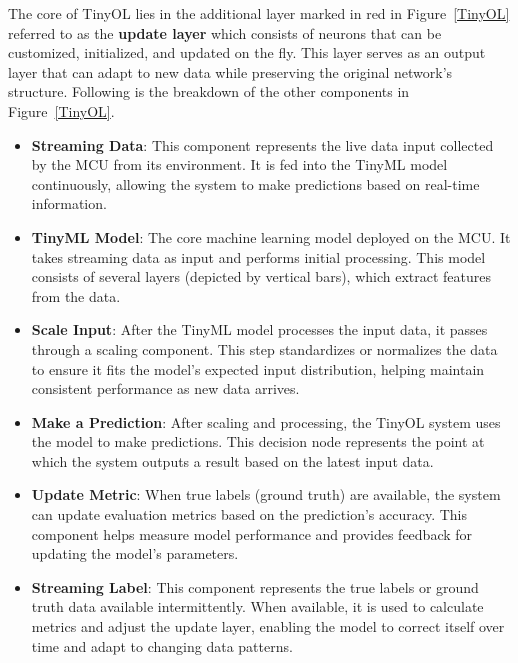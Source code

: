 \documentclass[twocolumn]{article}
\begin{document}
The core of TinyOL lies in the additional layer marked in red in Figure~\ref{TinyOL} referred to as the \textbf{update layer} which consists of neurons that can be customized, initialized, and updated on the fly. This layer serves as an output layer that can adapt to new data while preserving the original network's structure. Following is the breakdown of the other components in Figure~\ref{TinyOL}.

\begin{itemize}
    \item \textbf{Streaming Data}:
    This component represents the live data input collected by the MCU from its environment. It is fed into the TinyML model continuously, allowing the system to make predictions based on real-time information.

    \item \textbf{TinyML Model}:
    The core machine learning model deployed on the MCU. It takes streaming data as input and performs initial processing. This model consists of several layers (depicted by vertical bars), which extract features from the data.

    \item \textbf{Scale Input}:
    After the TinyML model processes the input data, it passes through a scaling component. This step standardizes or normalizes the data to ensure it fits the model’s expected input distribution, helping maintain consistent performance as new data arrives.

    \item \textbf{Make a Prediction}:
    After scaling and processing, the TinyOL system uses the model to make predictions. This decision node represents the point at which the system outputs a result based on the latest input data.

    \item \textbf{Update Metric}:
    When true labels (ground truth) are available, the system can update evaluation metrics based on the prediction’s accuracy. This component helps measure model performance and provides feedback for updating the model’s parameters.

    \item \textbf{Streaming Label}:
    This component represents the true labels or ground truth data available intermittently. When available, it is used to calculate metrics and adjust the update layer, enabling the model to correct itself over time and adapt to changing data patterns.
\end{itemize}
\end{document}

